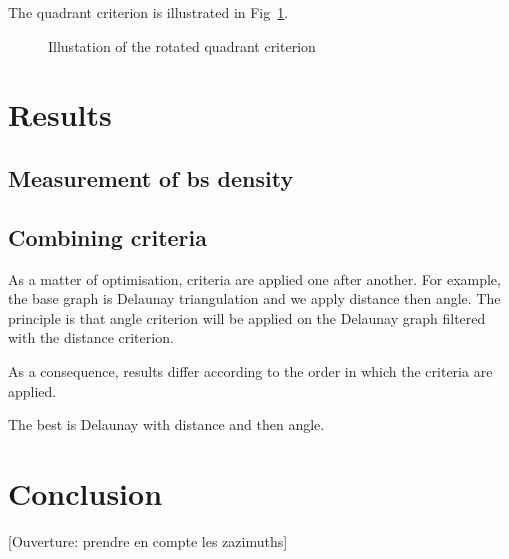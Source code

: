 \documentclass[lettersize,journal,english]{IEEEtran}
\begin{document}
The quadrant criterion is illustrated in Fig~\ref{fig:crit_qua}.
\begin{figure}[!t]
    \centering
    \caption{Illustation of the rotated quadrant criterion}
    \label{fig:crit_qua}
\end{figure}

\section{Results}

\subsection{Measurement of \acrshort{bs} density}

\subsection{Combining criteria}
As a matter of optimisation, criteria are applied one after another. For example, the base graph is Delaunay triangulation and we apply distance then angle.
The principle is that angle criterion will be applied on the Delaunay graph filtered with the distance criterion.

As a consequence, results differ according to the order in which the criteria are applied.

The best is Delaunay with distance and then angle.



\section{Conclusion}

[Ouverture: prendre en compte les zazimuths]

\printglossary[type=\acronymtype]
\printglossary



\end{document}
